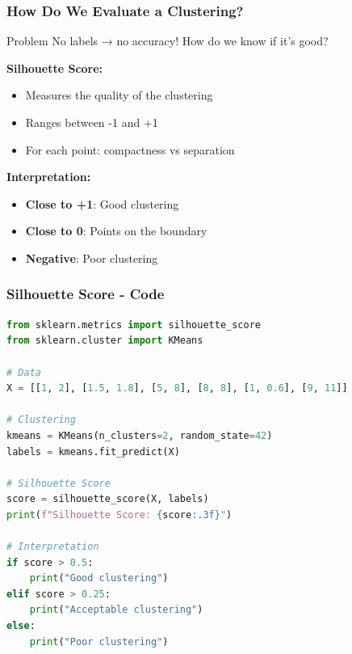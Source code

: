 \documentclass{beamer}
\begin{document}
\begin{frame}
\frametitle{How Do We Evaluate a Clustering?}
\begin{alertblock}{Problem}
No labels → no accuracy! How do we know if it's good?
\end{alertblock}

\vspace{1em}
\textbf{Silhouette Score:}
\begin{itemize}
    \item Measures the quality of the clustering
    \item Ranges between -1 and +1
    \item For each point: compactness vs separation
\end{itemize}

\vspace{0.5em}
\textbf{Interpretation:}
\begin{itemize}
    \item \textbf{Close to +1}: Good clustering
    \item \textbf{Close to 0}: Points on the boundary
    \item \textbf{Negative}: Poor clustering
\end{itemize}
\end{frame}

\begin{frame}[fragile]
\frametitle{Silhouette Score - Code}
\begin{lstlisting}[language=Python]
from sklearn.metrics import silhouette_score
from sklearn.cluster import KMeans

# Data
X = [[1, 2], [1.5, 1.8], [5, 8], [8, 8], [1, 0.6], [9, 11]]

# Clustering
kmeans = KMeans(n_clusters=2, random_state=42)
labels = kmeans.fit_predict(X)

# Silhouette Score
score = silhouette_score(X, labels)
print(f"Silhouette Score: {score:.3f}")

# Interpretation
if score > 0.5:
    print("Good clustering")
elif score > 0.25:
    print("Acceptable clustering")
else:
    print("Poor clustering")
\end{lstlisting}
\end{frame}
\end{document}
